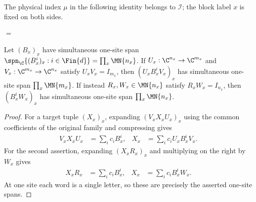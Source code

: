 The physical index $\mu$ in the following identity belongs to
$\mathcal I$; the block label $x$ is fixed on both sides.
\begin{tenkzequation}
    \tenkzkernel
    \begin{tenkz}[rows={wire}, cols=1, bonds=none]
    \end{tenkz}
    \quad $=$ \quad
    \begin{tenkz}[rows={wire}, cols=2, bonds=none]
    \end{tenkz}
\end{tenkzequation}

\begin{lemma}
    \label{thm:mpo_joint_one_site_span}
    \leanok
    Let $(B_x)_x$ have simultaneous one-site span
    $\spn_{\C}\{(B_x^i)_x:i\in\Fin{d}\}=\prod_x\MN{n_x}$.
    If $U_x:\C^{n_x}\to\C^{m_x}$ and
    $V_x:\C^{m_x}\to\C^{n_x}$ satisfy $U_xV_x=I_{m_x}$,
    then $(U_xB_x^iV_x)_x$ has simultaneous one-site span
    $\prod_x\MN{m_x}$. If instead $R_x,W_x\in\MN{n_x}$ satisfy
    $R_xW_x=I_{n_x}$, then $(B_x^iW_x)_x$ has simultaneous one-site
    span $\prod_x\MN{n_x}$.
\end{lemma}
\begin{proof}
    \leanok
    For a target tuple $(X_x)_x$, expanding $(V_xX_xU_x)_x$ using the
    common coefficients of the original family and compressing gives
    \begin{align}
        V_xX_xU_x & =\sum_i c_iB_x^i,
                  & X_x               & =\sum_i c_iU_xB_x^iV_x.
    \end{align}
    For the second assertion, expanding $(X_xR_x)_x$ and multiplying on the
    right by $W_x$ gives
    \begin{align}
        X_xR_x & =\sum_i c_iB_x^i,
               & X_x               & =\sum_i c_iB_x^iW_x.
    \end{align}
    At one site each word is a single letter, so these are precisely
    the asserted one-site spans.
\end{proof}

